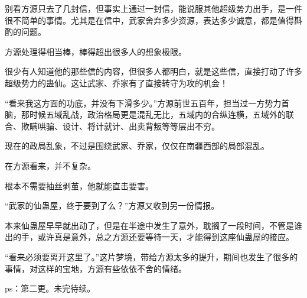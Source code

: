\begin{this_body}
别看方源只去了几封信，但事实上通过一封信，能说服其他超级势力出手，是一件很不简单的事情。尤其是在信中，武家舍弃多少资源，表达多少诚意，都是值得斟酌的问题。

方源处理得相当棒，棒得超出很多人的想象极限。

很少有人知道他的那些信的内容，但很多人都明白，就是这些信，直接打动了许多超级势力的蛊仙。这让武家、乔家有了直接转守为攻的机会！

“看来我这方面的功底，并没有下滑多少。”方源前世五百年，担当过一方势力首脑，那时候五域乱战，政治格局更是混乱无比，五域内的合纵连横，五域外的联合、欺瞒哄骗、设计、将计就计、出卖背叛等等层出不穷。

现在的政局乱象，不过是围绕武家、乔家，仅仅在南疆西部的局部混乱。

在方源看来，并不复杂。

根本不需要抽丝剥茧，他就能直击要害。

“武家的仙蛊屋，终于要到了么？”方源又收到另一份情报。

本来仙蛊屋早早就出动了，但是在半途中发生了意外，耽搁了一段时间，不管是谁出的手，或许真是意外，总之方源还要等待一天，才能得到这座仙蛊屋的接应。

“看来必须要离开这里了。”这片梦境，带给方源太多的提升，期间也发生了很多的事情，对这样的宝地，方源有些依依不舍的情绪。

ps：第二更。未完待续。

\end{this_body}

